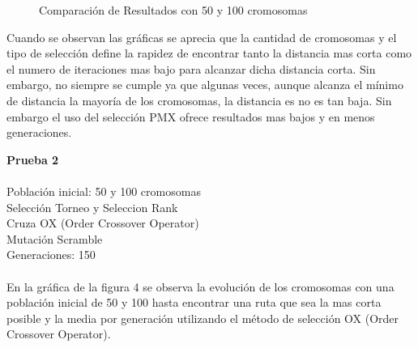 \documentclass[10pt,letterpaper]{article}
\begin{document}
\begin{figure}[H]
      \begin{center}
        \caption{Comparación de Resultados con 50 y 100 cromosomas}
        \label{Patron de señales para reconocimiento de señal Gaussiana}
      \end{center}
    \end{figure}

Cuando se observan las gráficas se aprecia que la cantidad de cromosomas y el tipo de selección define la rapidez de encontrar tanto la distancia mas corta como el numero de iteraciones mas bajo para alcanzar dicha distancia corta. Sin embargo, no siempre se cumple ya que algunas veces, aunque alcanza el mínimo de distancia la mayoría de los cromosomas, la distancia es no es tan baja. Sin embargo el uso del selección PMX ofrece resultados mas bajos y en menos generaciones.

\textbf{\large Prueba 2}
\\\\
Población inicial: 50 y 100 cromosomas\\
Selección Torneo y Seleccion Rank\\
Cruza OX (Order Crossover Operator)\\
Mutación Scramble\\
Generaciones: 150\\\\

En la gráfica de la figura 4 se observa la evolución de los cromosomas con una población inicial de 50 y 100 hasta encontrar una ruta que sea la mas corta posible y la media por generación utilizando el método de selección OX (Order Crossover Operator).
\end{document}
